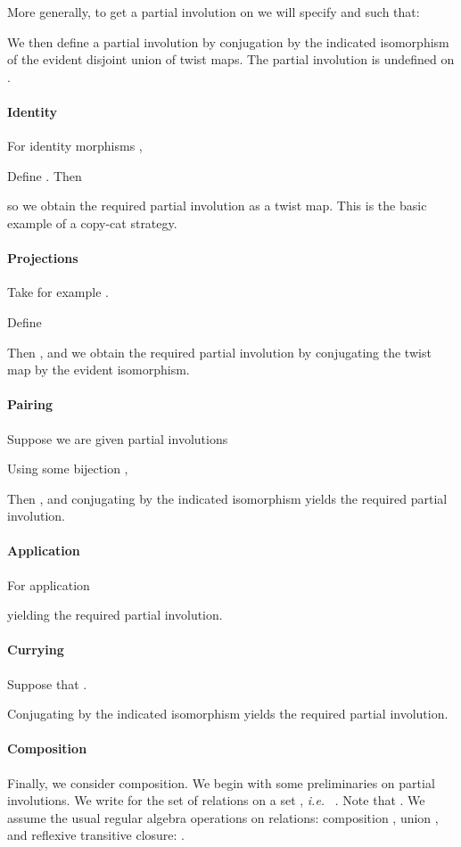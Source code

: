 \documentclass[a4paper,11pt]{article}
\newcommand{\ie}{\textit{i.e.}\ }
\begin{document}
More generally, to get a partial involution on  we will
specify  and  such
that:

We then define a partial involution by conjugation by the indicated
isomorphism  of the evident disjoint union of  twist maps. The partial involution is undefined on
.


\paragraph{Identity}
For identity morphisms ,

Define .
Then

so we obtain the required partial involution as a twist map. This is
the basic example of a copy-cat strategy.

\paragraph{Projections}
Take for example .

Define

Then , and we obtain the required
partial involution by conjugating the twist map by the evident
isomorphism.

\paragraph{Pairing}
Suppose we are given partial involutions


Using some bijection ,

Then , and conjugating by the indicated isomorphism yields the
required partial involution.

\paragraph{Application}
For application


yielding the required partial involution.

\paragraph{Currying}
Suppose that .

Conjugating   by the indicated isomorphism yields the required
partial involution.

\paragraph{Composition}
Finally, we consider composition. We begin with some preliminaries on
partial involutions.
We write  for the set of relations on a set , \ie
. Note that . We assume the usual regular algebra operations on relations:
composition , union , and reflexive transitive
closure: .
\end{document}
